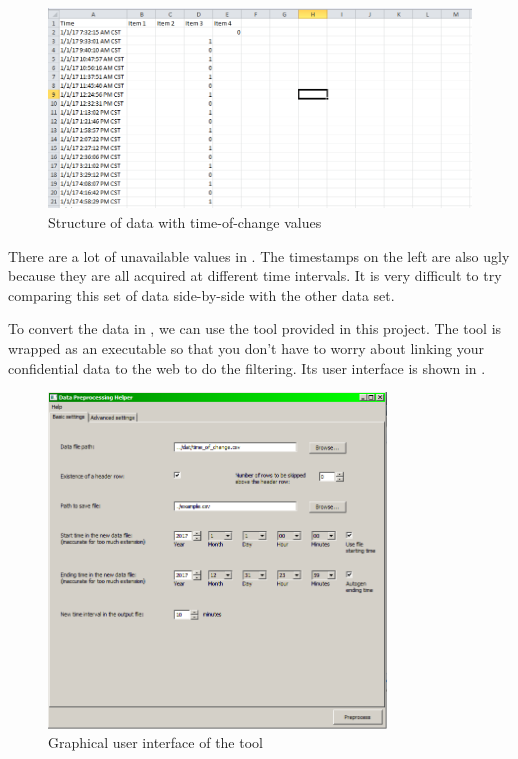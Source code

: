 \documentclass[12pt,a4paper]{article}
\begin{document}
\begin{figure}[H]
\centering
\includegraphics[width=1.0\textwidth]{time-of-change.png}
\caption{Structure of data with time-of-change values}
\label{fig:ugly_file}
\end{figure}

There are a lot of unavailable values in .
The timestamps on the left are also ugly because they are all acquired at different time intervals.
It is very difficult to try comparing this set of data side-by-side with the other data set.

To convert the data in , we can use the tool provided in this project.
The tool is wrapped as an executable so that you don't have to worry about linking your confidential data to the web to do the filtering.
Its user interface is shown in .

\begin{figure}[H]
\centering
\includegraphics[width=0.8\textwidth]{ui.png}
\caption{Graphical user interface of the tool}
\label{fig:ui}
\end{figure}
\end{document}
